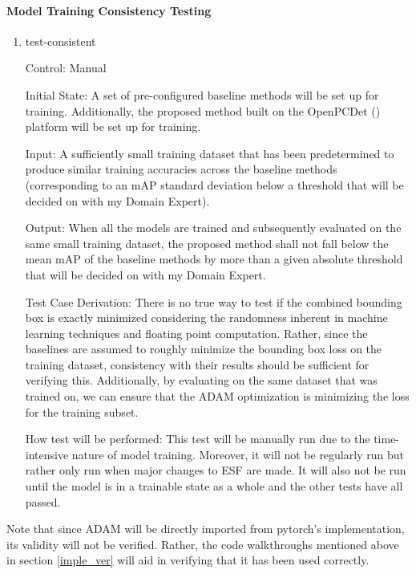 \documentclass[12pt, titlepage]{article}
\newcommand{\ProjectName}{ESF }
\begin{document}
\paragraph{Model Training Consistency Testing}
\begin{enumerate}

  \item{test-consistent\\}
  
  Control: Manual
            
  Initial State: A set of pre-configured baseline methods will be set up for training. Additionally, the proposed method built on the OpenPCDet (\cite{openpcdet2020}) platform
  will be set up for training.
            
  Input: A sufficiently small training dataset that has been predetermined to produce similar training accuracies across the baseline methods 
  (corresponding to an mAP standard deviation below a threshold that will be decided on with my Domain Expert).
            
  Output: When all the models are trained and subsequently evaluated on the same small training dataset, the proposed method shall not fall below the mean mAP of
  the baseline methods by more than a given absolute threshold that will be decided on with my Domain Expert.
  
  Test Case Derivation: There is no true way to test if the combined bounding box is exactly minimized considering the randomness inherent in machine learning techniques
  and floating point computation. Rather, since the baselines are assumed to roughly minimize the bounding box loss on the training dataset, consistency with their results 
  should be sufficient for verifying this. Additionally, by evaluating on the same dataset that was trained on, we can ensure that the ADAM optimization is minimizing the loss
  for the training subset.
            
  How test will be performed: This test will be manually run due to the time-intensive nature of model training. Moreover, it will not be regularly run but rather only run when 
  major changes to \ProjectName{} are made. It will also not be run until the model is in a trainable state as a whole and the other tests have all passed.
\end{enumerate}

Note that since ADAM will be directly imported from pytorch's implementation, its validity will not be verified. Rather, the code walkthroughs mentioned above in section \ref{imple_ver}
will aid in verifying that it has been used correctly.
\end{document}
